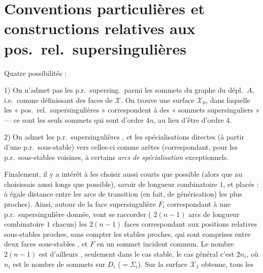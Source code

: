 \documentclass[11pt,a4paper]{article}
\begin{document}

\section*{Conventions particulières et constructions relatives aux pos.\ rel.\ supersingulières}

Quatre possibilités :

1) On n'admet pas les p.r.\ supersing.\ parmi les sommets du graphe du dépl.\ $A$, i.e.\ comme définissant des faces de $\mathcal{X}$. On trouve une surface $\mathcal{X}_0$, dans laquelle les « pos.\ rel.\ supersingulières » correspondent  à des « sommets supersinguliers » --- ce sont les seuls sommets qui sont d'ordre $4n$, au lieu d'être d'ordre $4$.

2) \struck{\ill{}} On admet les p.r.\ supersingulières , et les spécialisations directes (à partir d'une p.r.\ sous-stable) vers celles-ci comme arêtes (correspondant, pour les p.r.\ sous-stables voisines, à certains \emph{arcs} \emph{de spécialisation} exceptionnels.

Finalement, il y a intérêt à les choisir aussi courts que possible (alors que au  choisissais aussi longs que possible), savoir de longueur combinatoire $1$, et placés : à égale distance entre les arcs de transition (en fait, de générisation) les plus proches). Ainsi, autour de la face supersingulière $F_i$ correspondant à une p.r.\ supersingulière donnée, vont se raccorder (\struck{\ill{}}  $2(n-1)$ arcs de longueur combinatoire $1$ chacun) les $2(n-1)$ faces correspondant aux positions relatives sous-stables proches, sans compter les   stables proches, qui sont comprises \struck{\ill{}}  entre deux faces sous-stables , et  $F$ en un sommet incident commun. Le nombre $2(n-1)$ est d'ailleurs , seulement dans le cas stable,  le cas général c'est $2n_i$, où $n_i$ est le nombre de sommets sur $D_i$ ($= \Sigma_i$). Sur la surface $\mathcal{X}_1$ obtenue, tous les
\end{document}

